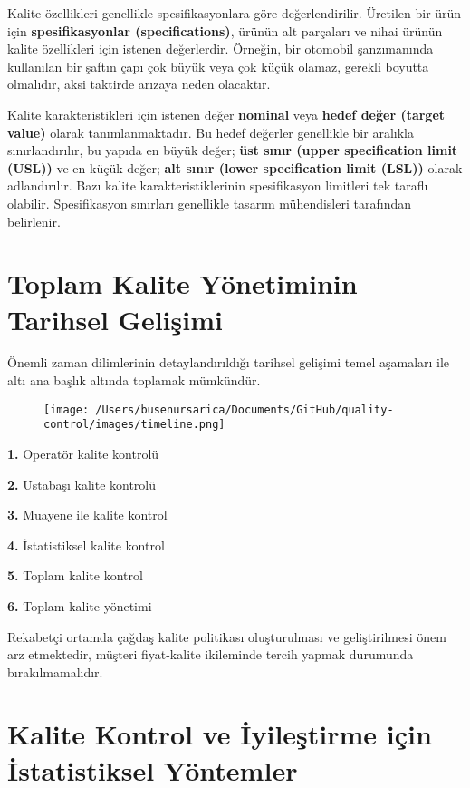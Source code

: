 \documentclass[
]{book}
\begin{document}
Kalite özellikleri genellikle spesifikasyonlara göre değerlendirilir. Üretilen bir ürün için \textbf{spesifikasyonlar (specifications)}, ürünün alt parçaları ve nihai ürünün kalite özellikleri için istenen değerlerdir. Örneğin, bir otomobil şanzımanında kullanılan bir şaftın çapı çok büyük veya çok küçük olamaz, gerekli boyutta olmalıdır, aksi taktirde arızaya neden olacaktır.

Kalite karakteristikleri için istenen değer \textbf{nominal} veya \textbf{hedef değer (target value)} olarak tanımlanmaktadır. Bu hedef değerler genellikle bir aralıkla sınırlandırılır, bu yapıda en büyük değer; \textbf{üst sınır (upper specification limit (USL))} ve en küçük değer; \textbf{alt sınır (lower specification limit (LSL))} olarak adlandırılır. Bazı kalite karakteristiklerinin spesifikasyon limitleri tek taraflı olabilir. Spesifikasyon sınırları genellikle tasarım mühendisleri tarafından belirlenir.

\hypertarget{toplam-kalite-yuxf6netiminin-tarihsel-geliux15fimi}{%
\section{Toplam Kalite Yönetiminin Tarihsel Gelişimi}\label{toplam-kalite-yuxf6netiminin-tarihsel-geliux15fimi}}

Önemli zaman dilimlerinin detaylandırıldığı tarihsel gelişimi temel aşamaları ile altı ana başlık altında toplamak mümkündür.

\begin{figure}
\centering
\texttt{[image: /Users/busenursarica/Documents/GitHub/quality-control/images/timeline.png]}
\end{figure}

\textbf{1.} Operatör kalite kontrolü

\textbf{2.} Ustabaşı kalite kontrolü

\textbf{3.} Muayene ile kalite kontrol

\textbf{4.} İstatistiksel kalite kontrol

\textbf{5.} Toplam kalite kontrol

\textbf{6.} Toplam kalite yönetimi

Rekabetçi ortamda çağdaş kalite politikası oluşturulması ve geliştirilmesi önem arz etmektedir, müşteri fiyat-kalite ikileminde tercih yapmak durumunda bırakılmamalıdır.

\hypertarget{kalite-kontrol-ve-iyileux15ftirme-iuxe7in-istatistiksel-yuxf6ntemler}{%
\section{Kalite Kontrol ve İyileştirme için İstatistiksel Yöntemler}\label{kalite-kontrol-ve-iyileux15ftirme-iuxe7in-istatistiksel-yuxf6ntemler}}
\end{document}
